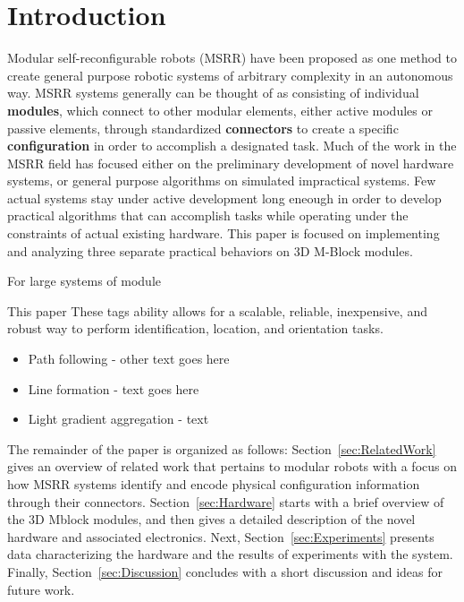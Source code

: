 \section{Introduction}
\label{sec:Introduction}

Modular self-reconfigurable robots (MSRR) have been proposed as one method to create general purpose robotic systems of arbitrary complexity in an autonomous way. MSRR systems generally can be thought of as consisting of individual \textbf{modules}, which connect to other modular elements, either active modules or passive elements, through standardized \textbf{connectors} to create a specific \textbf{configuration} in order to accomplish a designated task. Much of the work in the MSRR field has focused either on the preliminary development of novel hardware systems, or general purpose algorithms on simulated impractical systems. Few actual systems stay under active development long eneough in order to develop practical algorithms that can accomplish tasks while operating under the constraints of actual existing hardware. This paper is focused on implementing and analyzing three separate practical behaviors on 3D M-Block modules.

For large systems of module

This paper
These tags ability allows for a scalable, reliable, inexpensive, and robust way to perform identification, location, and orientation tasks. 

\begin{itemize}
	\item Path following - other text goes here
	\item Line formation - text goes here
	\item Light gradient aggregation - text
\end{itemize}

The remainder of the paper is organized as follows: Section~\ref{sec:RelatedWork} gives an overview of related
work that pertains to modular robots with a focus on how MSRR systems identify and encode physical configuration information through their connectors.
Section~\ref{sec:Hardware} starts with a brief overview of the 3D Mblock modules, and then gives a detailed description of the novel \tagName hardware and associated electronics.
Next, Section~\ref{sec:Experiments}
presents data characterizing the hardware and the results of
experiments with the system.
Finally, Section~\ref{sec:Discussion}
concludes with a short discussion and ideas for future work.



